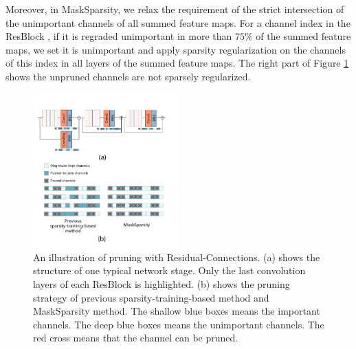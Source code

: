 \documentclass[review]{cvpr}
\begin{document}
Moreover, in MaskSparsity, we relax the requirement of the strict intersection of the unimportant channels of all summed feature maps. For a channel index in the ResBlock \cite{he2016deep}, if it is regraded unimportant in more than $75\%$ of the summed feature maps, we set it is unimportant and apply sparsity regularization on the channels of this index in all layers of the summed feature maps. The right part of Figure \ref{Pruningmask-method} shows the unpruned channels are not sparsely regularized.
   
\begin{figure}[h!]
	\begin{centering}
		\includegraphics[width=0.5\textwidth]{figure/resduial_prune.pdf}
		\caption{
			An illustration of pruning with Residual-Connections.
			(a) shows the structure of one typical network stage. Only the last convolution layers of each ResBlock is highlighted. 
			(b) shows the pruning strategy of previous sparsity-training-based method and MaskSparsity method.
			The shallow blue boxes means the important channels.
			The deep blue boxes means the unimportant channels.
			The red cross means that the channel can be pruned.
		}
	    \label{Pruningmask-method}
	\end{centering}
    
\end{figure}
\end{document}
